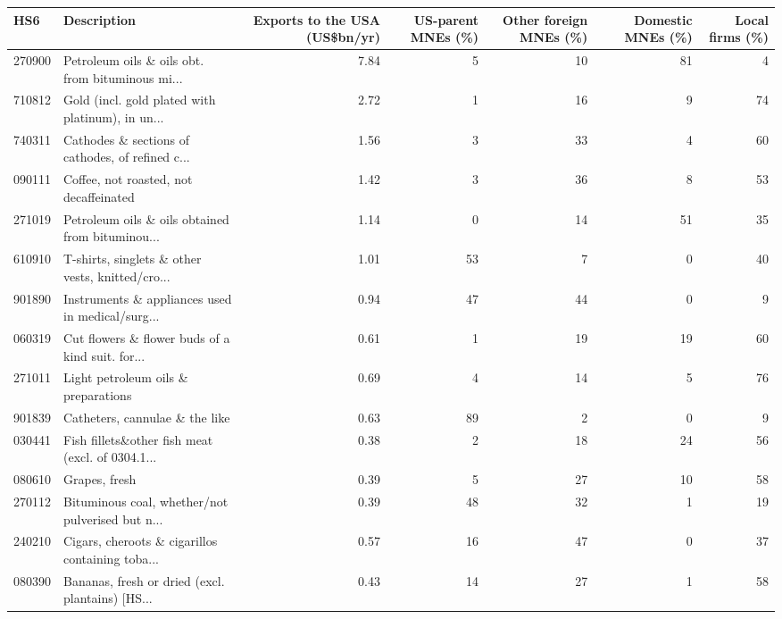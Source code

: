 \begin{tabular}{llrrrrr}
\toprule
HS6 & Description & \multicolumn{1}{p{2.0cm}}{\raggedright Exports to the USA (US\$bn/yr)} & \multicolumn{1}{p{1.8cm}}{\raggedright US-parent MNEs (\%)} & \multicolumn{1}{p{1.8cm}}{\raggedright Other foreign MNEs (\%)} & \multicolumn{1}{p{1.8cm}}{\raggedright Domestic MNEs (\%)} & \multicolumn{1}{p{1.8cm}}{\raggedright Local firms (\%)} \\
\midrule
270900 & Petroleum oils \& oils obt. from bituminous mi... & 7.84 & 5 & 10 & 81 & 4 \\
710812 & Gold (incl. gold plated with platinum), in un... & 2.72 & 1 & 16 & 9 & 74 \\
740311 & Cathodes \& sections of cathodes, of refined c... & 1.56 & 3 & 33 & 4 & 60 \\
090111 & Coffee, not roasted, not decaffeinated & 1.42 & 3 & 36 & 8 & 53 \\
271019 & Petroleum oils \& oils obtained from bituminou... & 1.14 & 0 & 14 & 51 & 35 \\
610910 & T-shirts, singlets \& other vests, knitted/cro... & 1.01 & 53 & 7 & 0 & 40 \\
901890 & Instruments \& appliances used in medical/surg... & 0.94 & 47 & 44 & 0 & 9 \\
060319 & Cut flowers \& flower buds of a kind suit. for... & 0.61 & 1 & 19 & 19 & 60 \\
271011 & Light petroleum oils \& preparations & 0.69 & 4 & 14 & 5 & 76 \\
901839 & Catheters, cannulae \& the like & 0.63 & 89 & 2 & 0 & 9 \\
030441 & Fish fillets\&other fish meat (excl. of 0304.1... & 0.38 & 2 & 18 & 24 & 56 \\
080610 & Grapes, fresh & 0.39 & 5 & 27 & 10 & 58 \\
270112 & Bituminous coal, whether/not pulverised but n... & 0.39 & 48 & 32 & 1 & 19 \\
240210 & Cigars, cheroots \& cigarillos containing toba... & 0.57 & 16 & 47 & 0 & 37 \\
080390 & Bananas, fresh or dried (excl. plantains) [HS... & 0.43 & 14 & 27 & 1 & 58 \\
\bottomrule
\end{tabular}

